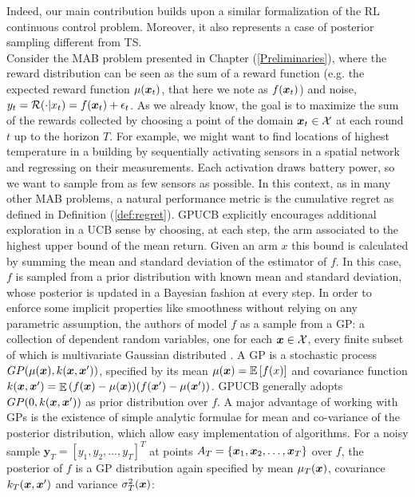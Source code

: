 Indeed, our main contribution builds upon a similar formalization of the \gls{RL} continuous control problem. Moreover, it also represents a case of posterior sampling different from \gls{TS}. \\
Consider the \gls{MAB} problem presented in Chapter (\ref{Preliminaries}), where the reward distribution can be seen as the sum of a reward function (e.g. the expected reward function $\mu(\boldsymbol{x}_t)$, that here we note as $f(\boldsymbol{x}_t)$) and noise, \ie $y_t = \mathcal{R}(\cdot|x_t) = f(\boldsymbol{x}_t) + \epsilon_t$. As we already know, the goal is to maximize the sum of the rewards collected by choosing a point of the domain $\boldsymbol{x}_t\in\mathcal{X}$ at each round $t$ up to the horizon $T$. For example, we might want to find locations of highest temperature in a building by sequentially activating sensors in a spatial network and regressing on their measurements. Each activation draws battery power, so we want to sample from as few sensors as possible.  In this context, as in many other \gls{MAB} problems, a natural performance metric is the cumulative regret as defined in Definition (\ref{def:regret}). \gls{GPUCB} explicitly encourages additional exploration in a \gls{UCB} sense by choosing, at each step, the arm associated to the highest upper bound of the mean return. Given an arm $x$  this bound is calculated by summing the mean and standard deviation of the estimator of $f$. In this case, $f$ is sampled from a prior distribution with known mean and standard deviation, whose posterior is updated in a Bayesian fashion at every step.
In order to enforce some implicit properties like smoothness without relying on any parametric assumption, the authors of \cite{srinivas2010gaussian} model $f$ as a sample from a \gls{GP}: a collection of dependent random variables, one for each $\boldsymbol{x}\in\mathcal{X}$, every finite subset of which is multivariate Gaussian distributed \cite{williams2006gaussian}. A \gls{GP} is a stochastic process $GP(\mu(\boldsymbol{x}), k(\boldsymbol{x},\boldsymbol{x}'))$, specified by its mean $\mu(\boldsymbol{x}) = \mathop{\mathbb{E}\left[{f(x)}\right]}$ and covariance function $k(\boldsymbol{x},\boldsymbol{x}') = \mathop{\mathbb{E}}{(f(\boldsymbol{x})-\mu(\boldsymbol{x}))(f(\boldsymbol{x}')-\mu(\boldsymbol{x}'))}$. \gls{GPUCB} generally adopts $GP(0,k(\boldsymbol{x},\boldsymbol{x}'))$ as prior distribution over $f$.  A major advantage of working with GPs is the existence of simple analytic formulae for mean and co-variance of the posterior distribution, which allow easy implementation of algorithms. For a noisy sample $\boldsymbol{y}_T = [y_1,y_2,\dots, y_T]^T$ at points $A_T = \{\boldsymbol{x}_1,\boldsymbol{x}_2,\dots,\boldsymbol{x}_T\}$ over $f$, the posterior of $f$ is a GP distribution again specified by mean $\mu_T(\boldsymbol{x})$, covariance $k_T(\boldsymbol{x},\boldsymbol{x}')$ and variance $\sigma^2_T(\boldsymbol{x})$:

